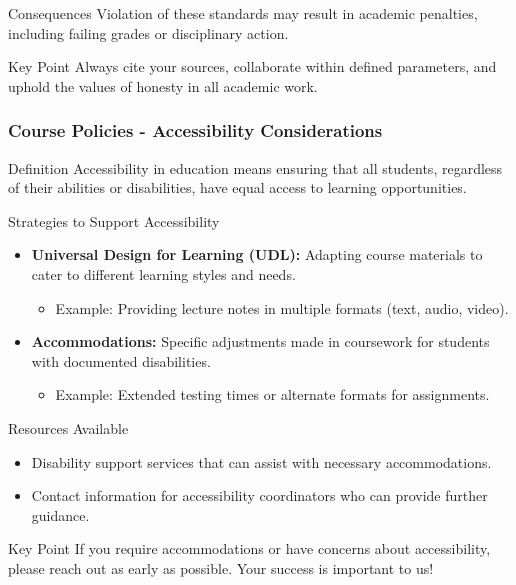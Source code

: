 \documentclass[aspectratio=169]{beamer}
\begin{document}
\begin{frame}[fragile]
  \begin{block}{Consequences}
    Violation of these standards may result in academic penalties, including failing grades or disciplinary action.
  \end{block}
  
  \begin{block}{Key Point}
    Always cite your sources, collaborate within defined parameters, and uphold the values of honesty in all academic work.
  \end{block}
\end{frame}

\begin{frame}[fragile]
  \frametitle{Course Policies - Accessibility Considerations}
  \begin{block}{Definition}
    Accessibility in education means ensuring that all students, regardless of their abilities or disabilities, have equal access to learning opportunities.
  \end{block}
  
  \begin{block}{Strategies to Support Accessibility}
    \begin{itemize}
      \item \textbf{Universal Design for Learning (UDL):} Adapting course materials to cater to different learning styles and needs.
      \begin{itemize}
        \item Example: Providing lecture notes in multiple formats (text, audio, video).
      \end{itemize}

      \item \textbf{Accommodations:} Specific adjustments made in coursework for students with documented disabilities.
      \begin{itemize}
        \item Example: Extended testing times or alternate formats for assignments.
      \end{itemize}
    \end{itemize}
  \end{block}
  
  \begin{block}{Resources Available}
    \begin{itemize}
      \item Disability support services that can assist with necessary accommodations.
      \item Contact information for accessibility coordinators who can provide further guidance.
    \end{itemize}
  \end{block}
  
  \begin{block}{Key Point}
    If you require accommodations or have concerns about accessibility, please reach out as early as possible. Your success is important to us!
  \end{block}
\end{frame}
\end{document}
